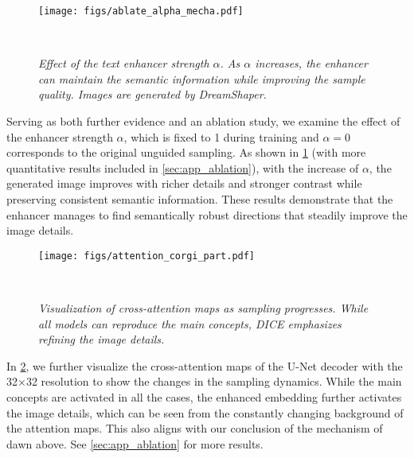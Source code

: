 \begin{figure}[t]
    \texttt{[image: figs/ablate\_alpha\_mecha.pdf]}
    \captionsetup{skip=2pt}
    \caption{\small \it Effect of the text enhancer strength $\alpha$. As $\alpha$ increases, the enhancer can maintain the semantic information while improving the sample quality. Images are generated by DreamShaper. 
    }
    \label{fig:ablate_alpha_fig}
 ~\vspace{-2em}
\end{figure}


Serving as both further evidence and an ablation study, we examine the effect of the enhancer strength $\alpha$, which is fixed to 1 during training and $\alpha=0$ corresponds to the original unguided sampling. As shown in \cref{fig:ablate_alpha_fig} (with more quantitative results included in \cref{sec:app_ablation}), with the increase of $\alpha$, the generated image improves with richer details and stronger contrast while preserving consistent semantic information.
These results demonstrate that the enhancer manages to find semantically robust directions that steadily improve the image details. 

\begin{figure}[t!]
    \texttt{[image: figs/attention\_corgi\_part.pdf]}
    \captionsetup{skip=2pt}
    \caption{\small \it Visualization of cross-attention maps as sampling progresses. While all models can reproduce the main concepts, DICE emphasizes refining the image details. 
    }
    \label{fig:attn}
~\vspace{-3em}
\end{figure}

In \cref{fig:attn}, we further visualize the cross-attention maps of the U-Net decoder with the 32$\times$32 resolution to show the changes in the sampling dynamics. While the main concepts are activated in all the cases, the enhanced embedding further activates the image details, which can be seen from the constantly changing background of the attention maps. This also aligns with our conclusion of the mechanism of \ourName dawn above.
See \cref{sec:app_ablation} for more results.



